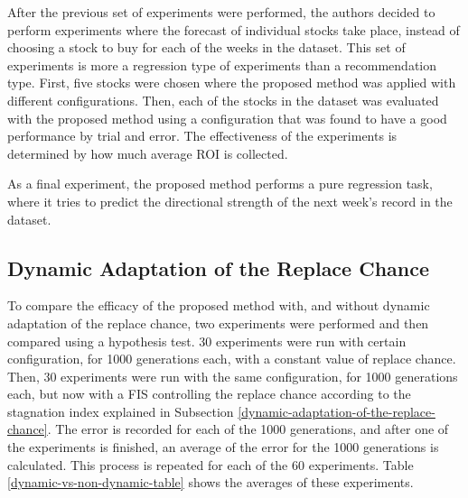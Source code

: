\documentclass[a4paper,twoside]{article}
\begin{document}
After the previous set of experiments were performed, the authors decided to perform experiments where the forecast of individual stocks take place, instead of choosing a stock to buy for each of the weeks in the dataset. This set of experiments is more a regression type of experiments than a recommendation type. First, five stocks were chosen where the proposed method was applied with different configurations. Then, each of the stocks in the dataset was evaluated with the proposed method using a configuration that was found to have a good performance by trial and error. The effectiveness of the experiments is determined by how much average ROI is collected.

As a final experiment, the proposed method performs a pure regression task, where it tries to predict the directional strength of the next week's record in the dataset.

\subsection{Dynamic Adaptation of the Replace Chance}

To compare the efficacy of the proposed method with, and without dynamic adaptation of the replace chance, two experiments were performed and then compared using a hypothesis test. 30 experiments were run with certain configuration, for 1000 generations each, with a constant value of replace chance. Then, 30 experiments were run with the same configuration, for 1000 generations each, but now with a FIS controlling the replace chance according to the stagnation index explained in Subsection \ref{dynamic-adaptation-of-the-replace-chance}. The error is recorded for each of the 1000 generations, and after one of the experiments is finished, an average of the error for the 1000 generations is calculated. This process is repeated for each of the 60 experiments. Table \ref{dynamic-vs-non-dynamic-table} shows the averages of these experiments.
\end{document}
